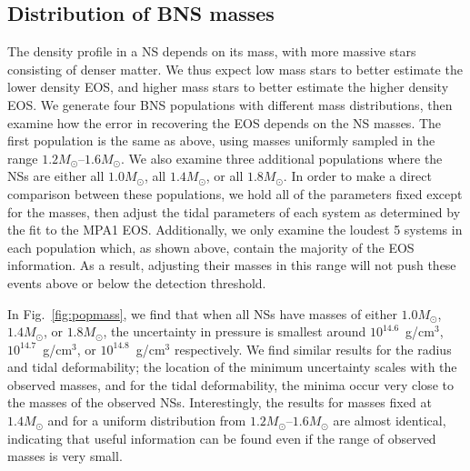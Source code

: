 \documentclass[twocolumn,prd,amssymb,aps,nofootinbib,showpacs,epsf]{revtex4}
\begin{document}
\subsection{Distribution of BNS masses}
\label{sec:varymass}

The density profile in a NS depends on its mass, with more massive stars consisting of denser matter. We thus expect low mass stars to better estimate the lower density EOS, and higher mass stars to better estimate the higher density EOS. We generate four BNS populations with different mass distributions, then examine how the error in recovering the EOS depends on the NS masses. The first population is the same as above, using masses uniformly sampled in the range $1.2M_\odot$--$1.6M_\odot$. We also examine three additional populations where the NSs are either all $1.0M_\odot$, all $1.4M_\odot$, or all $1.8M_\odot$. In order to make a direct comparison between these populations, we hold all of the parameters fixed except for the masses, then adjust the tidal parameters of each system as determined by the fit to the MPA1 EOS. Additionally, we only examine the loudest 5 systems in each population which, as shown above, contain the majority of the EOS information. As a result, adjusting their masses in this range will not push these events above or below the detection threshold. 

In Fig.~\ref{fig:popmass}, we find that when all NSs have masses of either $1.0M_\odot$, $1.4M_\odot$, or $1.8M_\odot$, the uncertainty in pressure is smallest around $10^{14.6}$~g/cm$^3$, $10^{14.7}$~g/cm$^3$, or $10^{14.8}$~g/cm$^3$ respectively. We find similar results for the radius and tidal deformability; the location of the minimum uncertainty scales with the observed masses, and for the tidal deformability, the minima occur very close to the masses of the observed NSs. Interestingly, the results for masses fixed at $1.4M_\odot$ and for a uniform distribution from $1.2M_\odot$--$1.6M_\odot$ are almost identical, indicating that useful information can be found even if the range of observed masses is very small.
\end{document}
